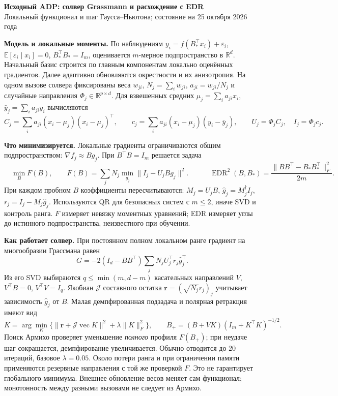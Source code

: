\documentclass[10pt,a4paper]{article}
\newcommand{\EDR}{\operatorname{EDR}}
\newcommand{\norm}[1]{\lVert#1\rVert}
\begin{document}
\begin{center}
 {\large\bfseries Исходный ADP: солвер Grassmann и расхождение с EDR}\\[2pt]
 {\small Локальный функционал и шаг Гаусса--Ньютона; состояние на 25 октября 2026 года}
\end{center}
\vspace{-5pt}

\textbf{Модель и локальные моменты.}
По наблюдениям $y_i=f(B_*^\top x_i)+\varepsilon_i$,
$\mathbb E[\varepsilon_i\mid x_i]=0$, $B_*^\top B_*=I_m$,
оценивается $m$-мерное подпространство в $\mathbb R^d$.
Начальный базис строится по главным компонентам локально оценённых
градиентов. Далее адаптивно обновляются окрестности и их анизотропия.
На одном вызове солвера фиксированы веса $w_{ji}$,
$N_j=\sum_i w_{ji}$, $a_{ji}=w_{ji}/N_j$ и случайные направления
$\Phi_j\in\mathbb R^{p\times d}$. Для взвешенных средних
$\mu_j=\sum_i a_{ji}x_i$, $\bar y_j=\sum_i a_{ji}y_i$ вычисляются
\[
 C_j=\sum_i a_{ji}(x_i-\mu_j)(x_i-\mu_j)^\top,\qquad
 c_j=\sum_i a_{ji}(x_i-\mu_j)(y_i-\bar y_j),\qquad
 U_j=\Phi_jC_j,\quad I_j=\Phi_jc_j.
\]

\textbf{Что минимизируется.}
Локальные градиенты ограничиваются общим подпространством:
$\nabla f_j\approx Bg_j$. При $B^\top B=I_m$ решается задача
\[
 \boxed{\quad\min_B F(B),\qquad
 F(B)=\sum_j N_j\min_{g_j}\norm{I_j-U_jBg_j}^2 .\quad}
 \qquad
 \EDR^2(B,B_*)=\frac{\norm{BB^\top-B_*B_*^\top}_F^2}{2m}.
\]
При каждом пробном $B$ коэффициенты пересчитываются:
$M_j=U_jB$, $\hat g_j=M_j^\dagger I_j$,
$r_j=I_j-M_j\hat g_j$.
Используются QR для безопасных систем с $m\le2$, иначе SVD
и контроль ранга. $F$ измеряет невязку моментных уравнений;
EDR измеряет углы до истинного подпространства, неизвестного при обучении.

\textbf{Как работает солвер.}
При постоянном полном локальном ранге градиент на многообразии Грассмана равен
\[
 G=-2(I_d-BB^\top)\sum_jN_jU_j^\top r_j\hat g_j^\top.
\]
Из его SVD выбираются $q\le\min(m,d-m)$ касательных направлений $V$,
$V^\top B=0$, $V^\top V=I_q$.
Якобиан $\mathcal J$ составного остатка
$\mathbf r=(\sqrt{N_j}r_j)_j$ учитывает зависимость $\hat g_j$ от $B$.
Малая демпфированная подзадача и полярная ретракция имеют вид
\[
 K=\arg\min_K\bigl\{\norm{\mathbf r+\mathcal J\operatorname{vec}K}^2
                         +\lambda\norm K_F^2\bigr\},\qquad
 B_+=(B+VK)(I_m+K^\top K)^{-1/2}.
\]
Поиск Армихо проверяет уменьшение \emph{полного} профиля $F(B_+)$;
при неудаче шаг сокращается, демпфирование увеличивается.
Обычно отводится до $20$ итераций, базовое $\lambda=0.05$.
Около потери ранга и при ограничении памяти применяются резервные
направления с той же проверкой $F$.
Это не гарантирует глобального минимума. Внешнее обновление весов меняет
сам функционал; монотонность между разными вызовами не следует из Армихо.
\end{document}
